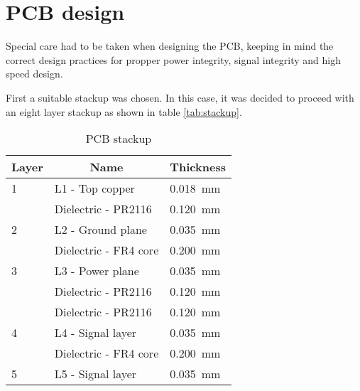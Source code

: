 \newpage
\chapter{PCB design}
Special care had to be taken when designing the PCB, keeping in mind the correct design practices for propper power integrity, signal integrity and high speed design. 

First a suitable stackup was chosen. In this case, it was decided to proceed with an eight layer stackup as shown in table \ref{tab:stackup}. 
\FloatBarrier
\begin{table}[htp!]
    \caption{PCB stackup}
    \begin{tabular}{|l|l|l|}
    \hline
    \multicolumn{1}{|c|}{\textbf{Layer}} & \multicolumn{1}{c|}{\textbf{Name}} & \multicolumn{1}{c|}{\textbf{Thickness}} \\ \hline
    1                                    & L1 - Top copper                    & \SI{0.018}{\milli\meter}                                   \\ \hline
                                         & Dielectric - PR2116                & \SI{0.120}{\milli\meter}                                   \\ \hline
    2                                    & L2 - Ground plane                  & \SI{0.035}{\milli\meter}                                   \\ \hline
                                         & Dielectric - FR4 core              & \SI{0.200}{\milli\meter}                                   \\ \hline
    3                                    & L3 - Power plane                   & \SI{0.035}{\milli\meter}                                   \\ \hline
                                         & Dielectric - PR2116                & \SI{0.120}{\milli\meter}                                   \\ \hline
                                         & Dielectric - PR2116                & \SI{0.120}{\milli\meter}                                   \\ \hline
    4                                    & L4 - Signal layer                  & \SI{0.035}{\milli\meter}                                   \\ \hline
                                         & Dielectric - FR4 core              & \SI{0.200}{\milli\meter}                                   \\ \hline
    5                                    & L5 - Signal layer                  & \SI{0.035}{\milli\meter}                                   \\ \hline

\end{tabular}
\end{table}
